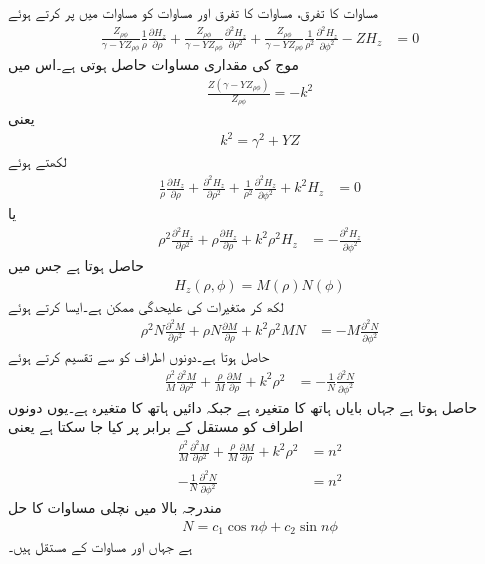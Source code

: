مساوات  کا  تفرق، مساوات  کا  تفرق اور مساوات  کو مساوات  میں پر کرتے ہوئے
\begin{align}
\frac{Z_{\rho \phi}}{\gamma-YZ_{\rho \phi}}\frac{1}{\rho}\frac{\partial H_z}{\partial \rho}+\frac{Z_{\rho \phi}}{\gamma-YZ_{\rho \phi}}\frac{\partial^2 H_z}{\partial \rho^2}+\frac{Z_{\rho \phi}}{\gamma-YZ_{\rho \phi}} \frac{1}{\rho^2}\frac{\partial^2 H_z}{\partial \phi^2} -Z H_{z}&=0
\end{align}
موج کی مقداری مساوات حاصل ہوتی ہے۔اس میں
\begin{align}
\frac{Z\left(\gamma-YZ_{\rho \phi}\right)}{Z_{\rho \phi}}=-k^2
\end{align} 
یعنی
\begin{align}\label{مساوات_مویج_ترسیلی_مستقل_الف}
k^2=\gamma^2+YZ
\end{align}
لکھتے ہوئے
\begin{align*}
\frac{1}{\rho}\frac{\partial H_z}{\partial \rho}+\frac{\partial^2 H_z}{\partial \rho^2}+\frac{1}{\rho^2}\frac{\partial^2 H_z}{\partial \phi^2} +k^2 H_{z}&=0
\end{align*}
یا
\begin{align}
\rho^2 \frac{\partial^2 H_z}{\partial \rho^2}+\rho \frac{\partial H_z}{\partial \rho} +k^2 \rho^2 H_{z}&=-\frac{\partial^2 H_z}{\partial \phi^2}
\end{align}
حاصل ہوتا ہے جس میں
\begin{align}\label{مساوات_مویج_نلکی_علیحدگی_مساوات}
H_z(\rho,\phi) =M(\rho) N(\phi)
\end{align}
لکھ کر متغیرات کی علیحدگی ممکن ہے۔ایسا کرتے ہوئے
\begin{align*}
\rho^2 N\frac{\partial^2 M}{\partial \rho^2} +\rho N \frac{\partial M}{\partial \rho} +k^2 \rho^2 M N&=-M \frac{\partial^2 N}{\partial \phi^2}
\end{align*}
حاصل ہوتا ہے۔دونوں اطراف کو  سے تقسیم کرتے ہوئے
\begin{align*}
\frac{\rho^2}{M} \frac{\partial^2 M}{\partial \rho^2} +\frac{\rho}{M} \frac{\partial M}{\partial \rho} +k^2 \rho^2 &=-\frac{1}{N} \frac{\partial^2 N}{\partial \phi^2}
\end{align*}
حاصل ہوتا ہے جہاں بایاں ہاتھ کا متغیرہ  ہے جبکہ دائیں ہاتھ کا متغیرہ  ہے۔یوں دونوں اطراف کو مستقل  کے برابر پر کیا جا سکتا ہے یعنی
\begin{align}
\frac{\rho^2}{M} \frac{\partial^2 M}{\partial \rho^2} +\frac{\rho}{M} \frac{\partial M}{\partial \rho} +k^2 \rho^2 &=n^2\label{مساوات_مویج_نلکی_علیحدہ_مساوات_الف}\\
-\frac{1}{N} \frac{\partial^2 N}{\partial \phi^2}&=n^2
\end{align}
مندرجہ بالا میں نچلی مساوات کا حل
\begin{align}
N=c_1 \cos n \phi +c_2 \sin n \phi
\end{align}
ہے جہاں  اور  مساوات کے مستقل ہیں۔

